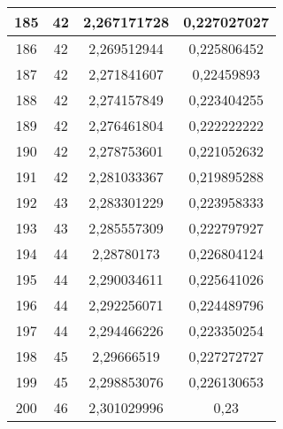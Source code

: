 {\begin{minipage}[!h]{0.45\textwidth}
\begin{longtable}{cccc}
185 & 42 & 2,267171728 & 0,227027027 \\ \hline
186 & 42 & 2,269512944 & 0,225806452 \\ \hline
187 & 42 & 2,271841607 & 0,22459893 \\ \hline
188 & 42 & 2,274157849 & 0,223404255 \\ \hline
189 & 42 & 2,276461804 & 0,222222222 \\ \hline
190 & 42 & 2,278753601 & 0,221052632 \\ \hline
191 & 42 & 2,281033367 & 0,219895288 \\ \hline
192 & 43 & 2,283301229 & 0,223958333 \\ \hline
193 & 43 & 2,285557309 & 0,222797927 \\ \hline
194 & 44 & 2,28780173 & 0,226804124 \\ \hline
195 & 44 & 2,290034611 & 0,225641026 \\ \hline
196 & 44 & 2,292256071 & 0,224489796 \\ \hline
197 & 44 & 2,294466226 & 0,223350254 \\ \hline
198 & 45 & 2,29666519 & 0,227272727 \\ \hline
199 & 45 & 2,298853076 & 0,226130653 \\ \hline
200 & 46 & 2,301029996 & 0,23 \\ \hline
\end{longtable}
\end{minipage}

}

